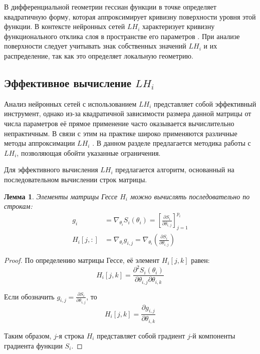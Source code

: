 \documentclass[a4paper,12pt]{article}
\newtheorem{lemma}{Лемма}
\begin{document}
В дифференциальной геометрии гессиан функции в точке определяет квадратичную форму, которая аппроксимирует
кривизну поверхности уровня этой функции. В контексте нейронных сетей $LH_i$ характеризует кривизну
функционального отклика слоя в пространстве его параметров \cite{dangel2019modular}. При анализе поверхности
следует учитывать знак собственных значений $LH_i$ и их распределение, так как это определяет
локальную геометрию.

\subsection{Эффективное вычисление $LH_i$}

Анализ нейронных сетей с использованием $LH_i$ представляет собой эффективный инструмент, однако из-за
квадратичной зависимости размера данной матрицы от числа параметров её прямое применение часто оказывается
вычислительно непрактичным. В связи с этим на практике широко применяются различные методы аппроксимации
$LH_i$ \cite{carlon2024, hare2024, martens2010, nocedal1980}. В данном разделе предлагается методика работы
с $LH_i$, позволяющая обойти указанные ограничения.

Для эффективного вычисления $LH_i$ предлагается алгоритм, основанный на последовательном
вычислении строк матрицы.

\begin{lemma}
  Элементы матрицы Гессе $H_i$ можно вычислять последовательно по строкам:
  \begin{equation}
    \begin{aligned}
      g_i &= \nabla_{\theta_i} S_i(\theta_i) = \left[ \frac{\partial S_i}{\partial \theta_{i,j}} \right]_{j=1}^{p_i} \\
      H_i[j,:] &= \nabla_{\theta_i} g_{i,j} = \nabla_{\theta_i} \left( \frac{\partial S_i}{\partial
      \theta_{i,j}} \right)
    \end{aligned}
  \end{equation}
\end{lemma}

\begin{proof}
  По определению матрицы Гессе, её элемент $H_i[j,k]$ равен:
  \begin{equation}
    H_i[j,k] = \frac{\partial^2 S_i(\theta_i)}{\partial \theta_{i,j} \partial \theta_{i,k}}
  \end{equation}

  Если обозначить $g_{i,j} = \frac{\partial S_i}{\partial \theta_{i,j}}$, то
  \begin{equation}
    H_i[j,k] = \frac{\partial g_{i,j}}{\partial \theta_{i,k}}
  \end{equation}

  Таким образом, $j$-я строка $H_i$ представляет собой градиент $j$-й компоненты градиента функции $S_i$.
\end{proof}
\end{document}
